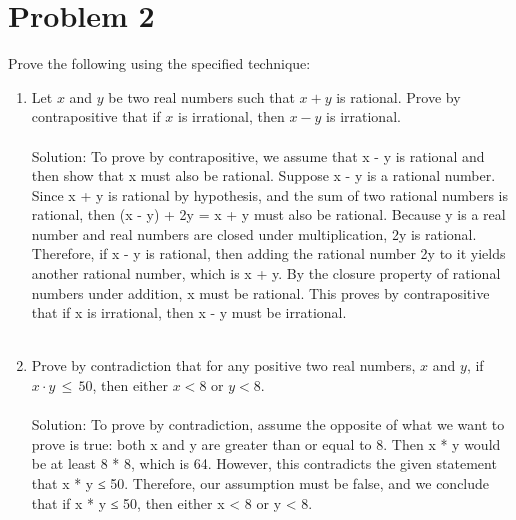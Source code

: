 \documentclass{amsart}
\theoremstyle{definition}
\theoremstyle{Exercise}
\theoremstyle{remark}
\theoremstyle{rule}
\numberwithin{equation}{section}
\begin{document}
  \section*{Problem 2}
  Prove the following using the specified technique:
  \begin{enumerate}[label=(\alph*)]
    \item Let $x$ and $y$ be two real numbers such that $x + y$ is rational. Prove by contrapositive that if $x$ is irrational, then $x - y$ is irrational.
          \\\\
Solution: To prove by contrapositive, we assume that x - y is rational and then show that x must also be rational. Suppose x - y is a rational number. Since x + y is rational by hypothesis, and the sum of two rational numbers is rational, then (x - y) + 2y = x + y must also be rational. Because y is a real number and real numbers are closed under multiplication, 2y is rational. Therefore, if x - y is rational, then adding the rational number 2y to it yields another rational number, which is x + y. By the closure property of rational numbers under addition, x must be rational. This proves by contrapositive that if x is irrational, then x - y must be irrational.
\\\\
    \item Prove by contradiction that for any positive two real numbers, $x$ and $y$,
         if $x\cdot y\, \leq \,50$, then either $x < 8$ or $y < 8$.
          \\\\
Solution: To prove by contradiction, assume the opposite of what we want to prove is true: both x and y are greater than or equal to 8. Then x * y would be at least 8 * 8, which is 64. However, this contradicts the given statement that x * y ≤ 50. Therefore, our assumption must be false, and we conclude that if x * y ≤ 50, then either x < 8 or y < 8.
\\\\
  \end{enumerate}
  \newpage
  \section*{}
\end{document}
